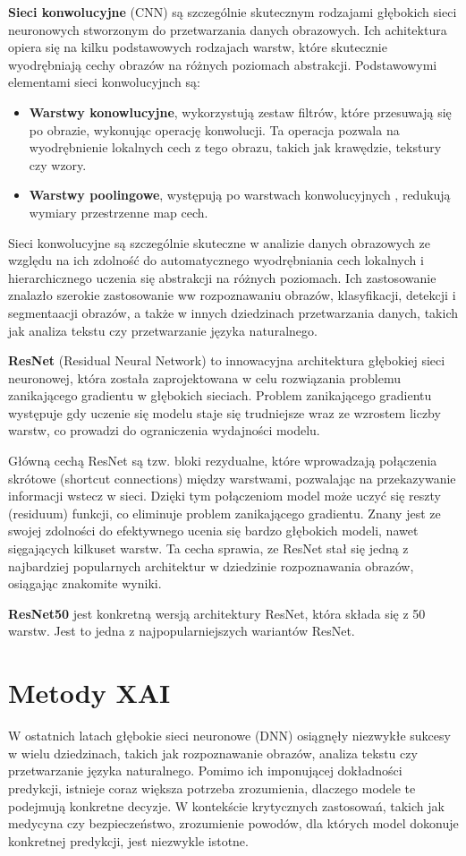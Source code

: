\textbf{Sieci konwolucyjne} (CNN) są szczególnie skutecznym rodzajami głębokich sieci neuronowych stworzonym do przetwarzania danych obrazowych.
Ich achitektura opiera się na kilku podstawowych rodzajach warstw, które skutecznie wyodrębniają cechy obrazów na różnych poziomach abstrakcji.
Podstawowymi elementami sieci konwolucyjnch są:
\begin{itemize}
	\item \textbf{Warstwy konowlucyjne}, wykorzystują zestaw filtrów, które przesuwają się po obrazie, wykonując operację konwolucji.
	      Ta operacja pozwala na wyodrębnienie lokalnych cech z tego obrazu, takich jak krawędzie, tekstury czy wzory.
	\item \textbf{Warstwy poolingowe}, występują po warstwach konwolucyjnych , redukują wymiary przestrzenne map cech.
\end{itemize}
Sieci konwolucyjne są szczególnie skuteczne w analizie danych obrazowych ze względu na ich zdolność do automatycznego wyodrębniania cech lokalnych i hierarchicznego uczenia się abstrakcji na różnych poziomach.
Ich zastosowanie znalazło szerokie zastosowanie ww rozpoznawaniu obrazów, klasyfikacji, detekcji i segmentaacji obrazów, a także w innych dziedzinach przetwarzania danych, takich jak analiza tekstu czy przetwarzanie języka naturalnego.

\textbf{ResNet} (Residual Neural Network) to innowacyjna architektura głębokiej sieci neuronowej, która została zaprojektowana w celu rozwiązania problemu zanikającego gradientu w głębokich sieciach.
Problem zanikającego gradientu występuje gdy uczenie się modelu staje się trudniejsze wraz ze wzrostem liczby warstw, co prowadzi do ograniczenia wydajności modelu.

Główną cechą ResNet są tzw. bloki rezydualne, które wprowadzają połączenia skrótowe (shortcut connections) między warstwami, pozwalając na przekazywanie informacji wstecz w sieci.
Dzięki tym połączeniom model może uczyć się reszty (residuum) funkcji, co eliminuje problem zanikającego gradientu.
Znany jest ze swojej zdolności do efektywnego ucenia się bardzo głębokich modeli, nawet sięgających kilkuset warstw.
Ta cecha sprawia, ze ResNet stał się jedną z najbardziej popularnych architektur w dziedzinie rozpoznawania obrazów, osiągając znakomite wyniki.

\textbf{ResNet50} jest konkretną wersją architektury ResNet, która składa się z 50 warstw.
Jest to jedna z najpopularniejszych wariantów ResNet.

\section*{Metody XAI}
W ostatnich latach głębokie sieci neuronowe (DNN) osiągnęły niezwykłe sukcesy w wielu dziedzinach, takich jak rozpoznawanie obrazów, analiza tekstu czy przetwarzanie języka naturalnego.
Pomimo ich imponującej dokładności predykcji, istnieje coraz większa potrzeba zrozumienia, dlaczego modele te podejmują konkretne decyzje.
W kontekście krytycznych zastosowań, takich jak medycyna czy bezpieczeństwo, zrozumienie powodów, dla których model dokonuje konkretnej predykcji, jest niezwykle istotne.

